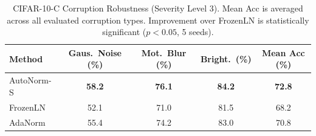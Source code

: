 \documentclass[final,3p,times,twocolumn]{elsarticle}
\begin{document}
\begin{table}[t]
\centering
\caption{Performance on Penn TreeBank (PTB) POS Tagging and SST-2
  Sentiment Classification. PTB Perplexity is computed on POS tag
  sequences and is not comparable to language modeling perplexity
  (see Section~\ref{sec:nlp}).}
\label{tab:nlp_results}
\end{table}

\begin{table}[t]
\centering
\caption{CIFAR-10-C Corruption Robustness (Severity Level 3). Mean Acc
  is averaged across all evaluated corruption types. Improvement over
  FrozenLN is statistically significant ($p < 0.05$, 5 seeds).}
\label{tab:robustness}
\setlength{\tabcolsep}{10pt}
\begin{tabular}{lcccc}
\toprule
\textbf{Method}
  & \textbf{Gaus.\ Noise (\%)}
  & \textbf{Mot.\ Blur (\%)}
  & \textbf{Bright.\ (\%)}
  & \textbf{Mean Acc (\%)} \\
\midrule
AutoNorm-S & \textbf{58.2} & \textbf{76.1} & \textbf{84.2} & \textbf{72.8} \\
FrozenLN   & 52.1          & 71.0          & 81.5          & 68.2          \\
AdaNorm    & 55.4          & 74.2          & 83.0          & 70.8          \\
\bottomrule
\end{tabular}
\end{table}
\end{document}
